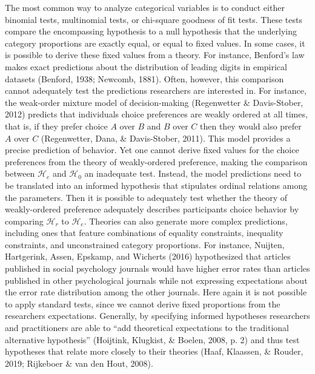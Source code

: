 \documentclass[
  english,
  man,floatsintext]{apa6}
\begin{document}
The most common way to analyze categorical variables is to conduct either binomial tests, multinomial tests, or chi-square goodness of fit tests. These tests compare the encompassing hypothesis to a null hypothesis that the underlying category proportions are exactly equal, or equal to fixed values. In some cases, it is possible to derive these fixed values from a theory. For instance, Benford's law makes exact predictions about the distribution of leading digits in empirical datasets (Benford, 1938; Newcomb, 1881). Often, however, this comparison cannot adequately test the predictions researchers are interested in. For instance, the weak-order mixture model of decision-making (Regenwetter \& Davis-Stober, 2012) predicts that individuals choice preferences are weakly ordered at all times, that is, if they prefer choice \(A\) over \(B\) and \(B\) over \(C\) then they would also prefer \(A\) over \(C\) (Regenwetter, Dana, \& Davis-Stober, 2011). This model provides a precise prediction of behavior. Yet one cannot derive fixed values for the choice preferences from the theory of weakly-ordered preference, making the comparison between \(\mathcal{H}_e\) and \(\mathcal{H}_0\) an inadequate test. Instead, the model predictions need to be translated into an informed hypothesis that stipulates ordinal relations among the parameters. Then it is possible to adequately test whether the theory of weakly-ordered preference adequately describes participants choice behavior by comparing \(\mathcal{H}_r\) to \(\mathcal{H}_e\). Theories can also generate more complex predictions, including ones that feature combinations of equality constraints, inequality constraints, and unconstrained category proportions. For instance, Nuijten, Hartgerink, Assen, Epskamp, and Wicherts (2016) hypothesized that articles published in social psychology journals would have higher error rates than articles published in other psychological journals while not expressing expectations about the error rate distribution among the other journals. Here again it is not possible to apply standard tests, since we cannot derive fixed proportions from the researchers expectations. Generally, by specifying informed hypotheses researchers and practitioners are able to ``add theoretical expectations to the traditional alternative hypothesis'' (Hoijtink, Klugkist, \& Boelen, 2008, p. 2) and thus test hypotheses that relate more closely to their theories (Haaf, Klaassen, \& Rouder, 2019; Rijkeboer \& van den Hout, 2008).
\end{document}
